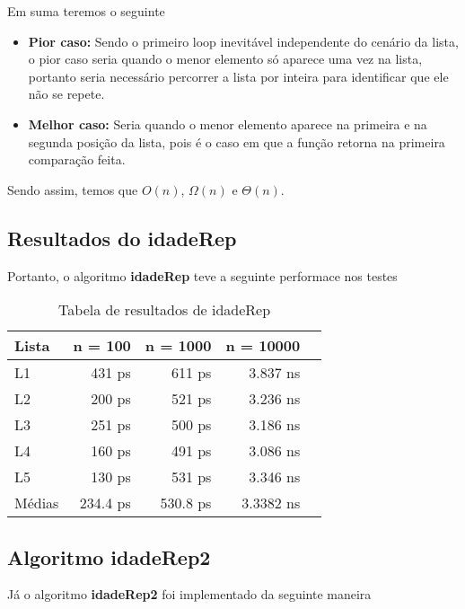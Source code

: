 Em suma teremos o seguinte

\begin{itemize}
	\item \textbf{Pior caso:} Sendo o primeiro loop inevitável independente do cenário da lista, o pior caso seria quando o menor elemento só aparece uma vez na lista, portanto seria necessário percorrer a lista por inteira para identificar que ele não se repete.

	\item \textbf{Melhor caso:} Seria quando o menor elemento aparece na primeira e na segunda posição da lista, pois é o caso em que a função retorna na primeira comparação feita.
\end{itemize}

Sendo assim, temos que $O(n)$, $\Omega(n)$ e $\Theta(n)$.

\subsection{Resultados do idadeRep}

Portanto, o algoritmo \textbf{idadeRep} teve a seguinte performace nos testes

\begin{table}[h!]
	\centering
	\caption{Tabela de resultados de idadeRep}
	\label{tab:idade_rep_result}
	\begin{tabular}{lrrrr}
		\toprule
		Lista   & n = 100   & n = 1000  & n = 10000 \\
		\midrule
		L1      & 431 ps    & 611 ps    & 3.837 ns  \\
		L2      & 200 ps    & 521 ps    & 3.236 ns  \\
		L3      & 251 ps    & 500 ps    & 3.186 ns  \\
		L4      & 160 ps    & 491 ps    & 3.086 ns  \\
		L5      & 130 ps    & 531 ps    & 3.346 ns  \\
		\midrule
		Médias  & 234.4 ps  & 530.8 ps  & 3.3382 ns \\
		\bottomrule
	\end{tabular}
\end{table}

\subsection{Algoritmo idadeRep2}

Já o algoritmo \textbf{idadeRep2} foi implementado da seguinte maneira 

